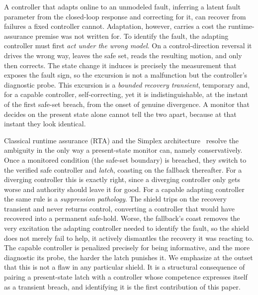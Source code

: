\documentclass[11pt]{article}
\theoremstyle{plain}
\theoremstyle{definition}
\begin{document}
A controller that adapts online to an unmodeled fault, inferring a latent fault parameter
from the closed-loop response and correcting for it, can recover from failures a fixed
controller cannot. Adaptation, however, carries a cost the runtime-assurance premise was not
written for. To identify the fault, the adapting controller must first \emph{act under the
wrong model}. On a control-direction reversal it drives the wrong way, leaves the safe set,
reads the resulting motion, and only then corrects. The state change it induces is precisely
the measurement that exposes the fault sign, so the excursion is not a malfunction but the
controller's diagnostic probe. This excursion is a \emph{bounded recovery transient},
temporary and, for a capable controller, self-correcting, yet it is indistinguishable, at
the instant of the first safe-set breach, from the onset of genuine divergence. A monitor
that decides on the present state alone cannot tell the two apart, because at that instant
they look identical.

Classical runtime assurance (RTA) and the Simplex architecture~\cite{Sha2001,Hook2016}
resolve the ambiguity in the only way a present-state monitor can, namely conservatively.
Once a monitored condition (the safe-set boundary) is breached, they switch to the verified
safe controller and \emph{latch}, coasting on the fallback thereafter. For a diverging
controller this is exactly right, since a diverging controller only gets worse and authority
should leave it for good. For a capable adapting controller the same rule is a
\emph{suppression pathology}. The shield trips on the recovery transient and never returns
control, converting a controller that would have recovered into a permanent safe-hold.
Worse, the fallback's coast removes the very excitation the adapting controller needed to
identify the fault, so the shield does not merely fail to help, it actively dismantles the
recovery it was reacting to. The capable controller is penalized precisely for being
informative, and the more diagnostic its probe, the harder the latch punishes it. We
emphasize at the outset that this is not a flaw in any particular shield. It is a structural
consequence of pairing a present-state latch with a controller whose competence expresses
itself as a transient breach, and identifying it is the first contribution of this paper.
\end{document}
